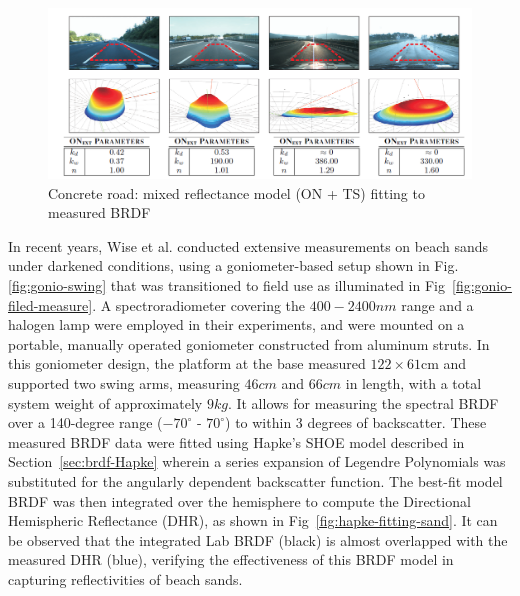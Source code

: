 \begin{figure}[!tb]
    \centering
    \includegraphics[width=0.9\linewidth]{./figures/measurement-literature/ON-fitting-road-concrete.png}
    \caption{Concrete road: mixed reflectance model (ON + TS) fitting to measured BRDF}
    \label{fig:ON-fitting-road-concrete}
\end{figure}

In recent years, Wise et al. conducted extensive measurements on beach sands under darkened conditions\cite{2022_Wise}, using a goniometer-based setup shown in Fig.\ref{fig:gonio-swing} that was transitioned to field use as illuminated in Fig~\ref{fig:gonio-filed-measure}.
A spectroradiometer covering the $400-2400nm$ range and a halogen lamp were employed in their experiments,  and were mounted on a portable, manually operated goniometer constructed from aluminum struts.
In this goniometer design, the platform at the base measured $122 \times 61$cm and supported two swing arms, measuring $46cm$ and $66cm$ in length, with a total system weight of approximately $9kg$.
It allows for measuring the spectral BRDF over a 140-degree range ($-70^\circ$ - $70^\circ$) to within 3 degrees of backscatter.
These measured BRDF data were fitted using Hapke's SHOE model described in Section~\eqref{sec:brdf-Hapke} wherein a series expansion of Legendre Polynomials was substituted for the angularly dependent backscatter function.
The best-fit model BRDF was then integrated over the hemisphere to compute the Directional Hemispheric Reflectance (DHR), as shown in Fig~\ref{fig:hapke-fitting-sand}.
It can be observed that the integrated Lab BRDF (black) is almost overlapped with the measured DHR (blue), verifying the effectiveness of this BRDF model in capturing reflectivities of beach sands.

